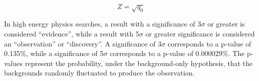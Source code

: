 \begin{equation}
\label{eqn:signif3}
Z = \sqrt{q_{0}}
\end{equation}

In high energy physics searches, a result with a significance of 3$\sigma$ or greater is considered  ``evidence'', while a result with 5$\sigma$ or greater significance
is considered an ``observation'' or ``discovery''. A significance of 3$\sigma$ corresponds to a p-value of 0.135$\%$, while a significance of 5$\sigma$ corresponds to a p-value
of 0.000029$\%$. The p-values represent the probability, under the background-only hypothesis, that the backgrounds randomly fluctuated to produce the observation.
